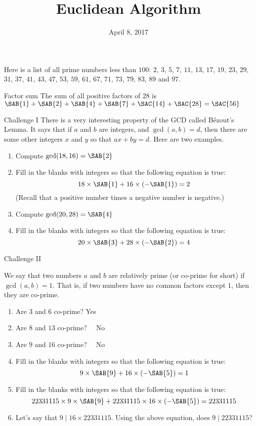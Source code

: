 \documentclass[12pt,letterpaper]{article}
\title{Euclidean Algorithm}
\date{April 8, 2017}
\begin{document}
\maketitle

\thispagestyle{empty}

Here is a list of all prime numbers less than $100$: $2$, $3$, $5$, $7$, $11$,
$13$, $17$, $19$, $23$, $29$, $31$, $37$, $41$, $43$, $47$, $53$, $59$, $61$,
$67$, $71$, $73$, $79$, $83$, $89$ and $97$.

\begin{problem}{Factor sum}
 The sum of all positive factors of $28$ is
 $\SAB{1} +
 \SAB{2} +
 \SAB{4} +
 \SAB{7} +
 \SAC{14} +
 \SAC{28} = \SAC{56}$
\end{problem}

\begin{problem}{Challenge I}
 There is a very interesting property of the GCD called B\'ezout's Lemma. It
 says that if $a$ and $b$ are integers, and $\gcd(a, b) = d$, then there are
 some other integers $x$ and $y$ so that $ax + by = d$. Here are two examples.

 \begin{enumerate}
  \item Compute $\gcd(18, 16) = \SAB{2}$
  \item Fill in the blanks with integers so that the following equation is true:
  \[ 18 \times \SAB{1} + 16 \times (- \SAB{1}) = 2 \]
  (Recall that a positive number times a negative number is negative.)
  \item Compute $\gcd(20, 28) = \SAB{4}$
  \item Fill in the blanks with integers so that the following equation is true:
  \[ 20 \times \SAB{3} + 28 \times (- \SAB{2}) = 4 \]
 \end{enumerate}
\end{problem}

\begin{problem}{Challenge II}

 We say that two numbers $a$ and $b$ are relatively prime (or co-prime for
 short) if $\gcd(a, b) = 1$. That is, if two numbers have no common factors
 except $1$, then they are co-prime.

 \begin{enumerate}
  \item Are $3$ and $6$ co-prime?  \hfill Yes~~
  \item Are $8$ and $13$ co-prime? \hfill {}~~No
  \item Are $9$ and $16$ co-prime? \hfill {}~~No
  \item Fill in the blanks with integers so that the following equation is true:
  \[ 9 \times \SAB{9} + 16 \times (-\SAB{5}) = 1 \]
  \item Fill in the blanks with integers so that the following equation is true:
  \[ 22331115 \times 9 \times \SAB{9} + 22331115 \times 16 \times (-\SAB{5}) =
  22331115 \]
  \item Let's say that $9 \mid 16\times22331115$. Using the above equation,
  does $9\mid22331115$? 
 \end{enumerate}
\end{problem}
\end{document}
